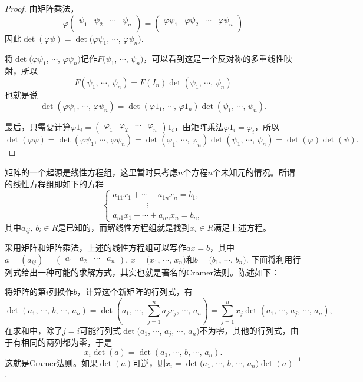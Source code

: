 \begin{proof} 
	由矩阵乘法，
	\[
	\varphi
	\begin{pmatrix}
	\psi_{1} & \psi_{2} & \cdots & \psi_{n}\\
	\end{pmatrix}
	=
	\begin{pmatrix}
	\varphi\psi_{1} & \varphi\psi_{2} & \cdots & \varphi\psi_{n}\\
	\end{pmatrix}
	\]
	因此$\det (\varphi \psi)=\det (\varphi\psi_{1}$, $\cdots$, $\varphi\psi_{n})$.

	将$\det(\varphi\psi_{1}$, $\cdots$, $\varphi\psi_{n})$记作$F(\psi_{1}$, $\cdots$, $\psi_{n})$，可以看到这是一个反对称的多重线性映射，所以
	\[
	F(\psi_{1},\,\cdots\!,\,\psi_{n})=F(I_n)\det (\psi_{1},\,\cdots\!,\,\psi_{n})
	\]
	也就是说
	\[
	\det (\varphi\psi_{1},\,\cdots\!,\,\varphi\psi_{n})=\det(\varphi 1_1,\,\cdots\!,\,\varphi 1_n)\det(\psi_{1},\,\cdots\!,\,\psi_{n}).
	\]

	最后，只需要计算$\varphi 1_i=\begin{pmatrix}\varphi_{1} & \varphi_{2} & \cdots & \varphi_{n}\end{pmatrix}1_i$，由矩阵乘法$\varphi 1_i=\varphi_i$，所以
	\[
	\det(\varphi\psi)=\det(\varphi\psi_{1},\,\cdots\!,\,\varphi\psi_{n})=\det(\varphi_1,\,\cdots\!,\,\varphi_n)\det(\psi_{1},\,\cdots\!,\,\psi_{n})=\det(\varphi)\det(\psi).
	\]
\end{proof}

\para 矩阵的一个起源是线性方程组，这里暂时只考虑$n$个方程$n$个未知元的情况。所谓的线性方程组即如下的方程
\[
	\begin{cases}
	a_{11}x_1+\cdots+a_{1n}x_n=b_1,\\
	\qquad\qquad\,\vdots\\
	a_{n1}x_1+\cdots+a_{nn}x_n=b_n,
	\end{cases}
\]
其中$a_{ij}$, $b_i\in R$是已知的，而解线性方程组就是找到$x_i\in R$满足上述方程。

采用矩阵和矩阵乘法，上述的线性方程组可以写作$ax=b$，其中$a=(a_{ij})=\begin{pmatrix}a_{1} & a_{2} & \cdots & a_{n}\end{pmatrix}$, $x=(x_1$, $\cdots$, $x_n)$和$b=(b_1$, $\cdots$, $b_n)$. 下面将利用行列式给出一种可能的求解方式，其实也就是著名的Cramer法则。陈述如下：

将矩阵的第$i$列换作$b$，计算这个新矩阵的行列式，有
\[
	\det(a_1,\,\cdots\!,\,b,\,\cdots\!,\,a_n)=\det\left(a_1,\,\cdots\!,\,\sum_{j=1}^na_j x_j,\,\cdots\!,\,a_n\right)=\sum_{j=1}^n x_j \det(a_1,\,\cdots\!,\,a_j,\,\cdots\!,\,a_n),
\]
在求和中，除了$j=i$可能行列式$\det(a_1$, $\cdots$, $a_j$, $\cdots$, $a_n)$不为零，其他的行列式，由于有相同的两列都为零，于是
\[
	x_i \det(a)=\det(a_1,\,\cdots\!,\,b,\,\cdots\!,\,a_n).
\]
这就是Cramer法则。如果$\det(a)$可逆，则$x_i=\det(a_1$, $\cdots$, $b$, $\cdots$, $a_n)\det(a)^{-1}$.

